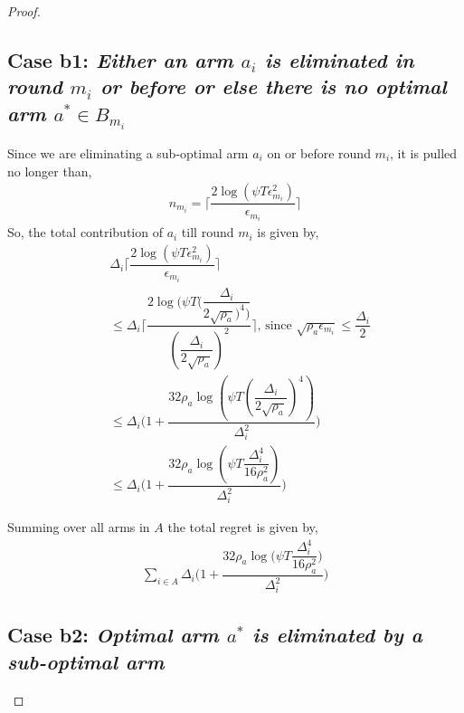 \begin{proof}
\subsection*{Case b1: \textit{Either an arm $a_{i}$ is eliminated in round $m_{i}$ or before or else there is no optimal arm $a^{*}\in B_{m_{i}}$ }}
 Since we are eliminating a sub-optimal arm $a_{i}$ on or before round $m_{i}$, it is pulled no longer than, 
 \begin{align*}
 n_{m_{i}}=\bigg\lceil\dfrac{2\log{(\psi T\epsilon_{m_{i}}^{2})}}{\epsilon_{m_{i}}}\bigg\rceil
 \end{align*}
So, the total contribution of $a_{i}$  till round $m_{i}$ is given by, 
\begin{align*}
&\Delta_{i}\bigg\lceil\dfrac{2\log{(\psi T\epsilon_{m_{i}}^{2})}}{\epsilon_{m_{i}}}\bigg\rceil\\
&\leq\Delta_{i}\bigg\lceil\dfrac{2\log{(\psi T(\dfrac{\Delta_{i}}{2\sqrt{\rho_{a}})^{4})}}}{(\dfrac{\Delta_{i}}{2\sqrt{\rho_{a}}})^{2}}\bigg\rceil \text{, since } \sqrt{\rho_{a}\epsilon_{m_{i}}}\leq\dfrac{\Delta_{i}}{2}\\
&\leq\Delta_{i}\bigg(1+\dfrac{32\rho_{a}\log{(\psi T(\dfrac{\Delta_{i}}{2\sqrt{\rho_{a}}})^{4})}}{\Delta_{i}^{2}}\bigg)
\\
&\leq\Delta_{i}\bigg(1+\dfrac{32\rho_{a}\log{(\psi T\dfrac{\Delta_{i}^{4}}{16\rho_{a}^{2}})}}{\Delta_{i}^{2}}\bigg)
\end{align*} 
 
Summing over all arms in $A$ the total regret is given by, 
\begin{align*}
\sum_{i\in A}\Delta_{i}\bigg(1+\dfrac{32\rho_{a}\log{(\psi T\dfrac{\Delta_{i}^{4}}{16\rho_{a}^{2}}})}{\Delta_{i}^{2}}\bigg)
\end{align*}

\subsection*{Case b2: \textit{Optimal arm $a^{*}$ is eliminated by a sub-optimal arm  }}



\end{proof}
